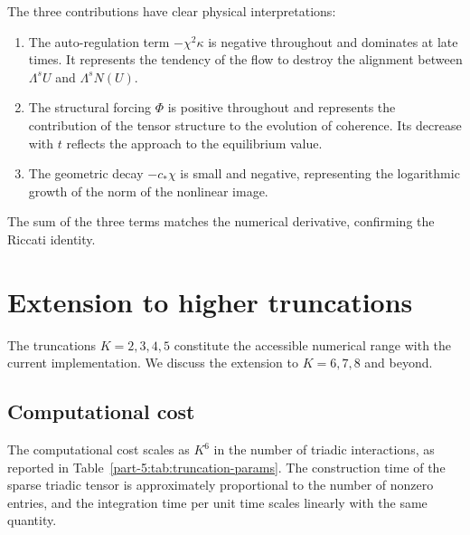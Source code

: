 \begin{remark}[Interpretation]\label{part-5:rem:riccati-interp-V}
The three contributions have clear physical interpretations:
\begin{enumerate}[label=(\roman*),leftmargin=*]
\item The auto-regulation term $-\chi^2\kappa$ is negative 
      throughout and dominates at late times. It represents the 
      tendency of the flow to destroy the alignment between 
      $\Lambda^s U$ and $\Lambda^s N(U)$.
\item The structural forcing $\Phi$ is positive throughout and 
      represents the contribution of the tensor structure to the 
      evolution of coherence. Its decrease with $t$ reflects the 
      approach to the equilibrium value.
\item The geometric decay $-c_\ast\chi$ is small and negative, 
      representing the logarithmic growth of the norm of the 
      nonlinear image.
\end{enumerate}
The sum of the three terms matches the numerical derivative, 
confirming the Riccati identity.
\end{remark}

\section{Extension to higher truncations}
\label{part-5:sec:higher-truncations}

The truncations $K=2,3,4,5$ constitute the accessible numerical 
range with the current implementation. We discuss the extension to 
$K=6,7,8$ and beyond.

\subsection{Computational cost}
\label{part-5:ssec:cost}

The computational cost scales as $K^6$ in the number of triadic 
interactions, as reported in Table~\ref{part-5:tab:truncation-params}. The 
construction time of the sparse triadic tensor is approximately 
proportional to the number of nonzero entries, and the integration 
time per unit time scales linearly with the same quantity.


